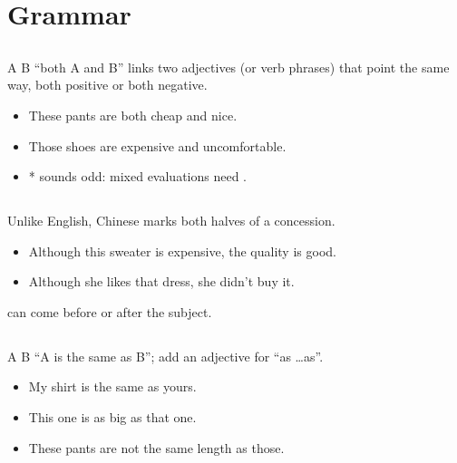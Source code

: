 \section{Grammar}

\subsection{}

 A  B ``both A and B'' links two adjectives (or verb phrases) that point the
same way, both positive or both negative.
\begin{itemize}
  \item {} These pants are both cheap and nice.
  \item {} Those shoes are expensive and uncomfortable.
  \item * sounds odd: mixed evaluations need .
\end{itemize}

\subsection{}

Unlike English, Chinese marks both halves of a concession.
\begin{itemize}
  \item {} Although this sweater is expensive, the
        quality is good.
  \item {} Although she likes that dress, she didn't
        buy it.
\end{itemize}
 can come before or after the subject.

\subsection{}

A  B  ``A is the same as B''; add an adjective for ``as \ldots as''.
\begin{itemize}
  \item {} My shirt is the same as yours.
  \item {} This one is as big as that one.
  \item {} These pants are not the same length as those.
\end{itemize}

